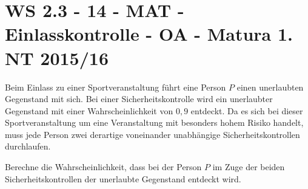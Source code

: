 \section{WS 2.3 - 14 - MAT - Einlasskontrolle - OA - Matura 1. NT 2015/16}

\begin{beispiel}{1} %
Beim Einlass zu einer Sportveranstaltung führt eine Person $P$ einen unerlaubten Gegenstand mit
sich. Bei einer Sicherheitskontrolle wird ein unerlaubter Gegenstand mit einer Wahrscheinlichkeit
von $0,9$ entdeckt. Da es sich bei dieser Sportveranstaltung um eine Veranstaltung mit besonders
hohem Risiko handelt, muss jede Person zwei derartige voneinander unabhängige Sicherheitskontrollen
durchlaufen. \leer

Berechne die Wahrscheinlichkeit, dass bei der Person $P$ im Zuge der beiden Sicherheitskontrollen
der unerlaubte Gegenstand entdeckt wird.


\end{beispiel}
